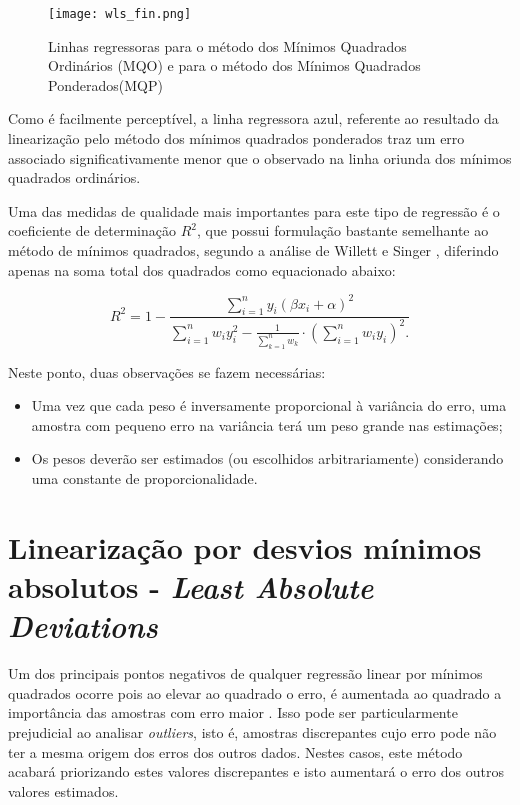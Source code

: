 \begin{figure}[htp]
    \centering
    \texttt{[image: wls\_fin.png]}
    \caption{Linhas regressoras para o método dos Mínimos Quadrados Ordinários (MQO) e para o método dos Mínimos Quadrados Ponderados(MQP)}
    \label{fig:mqomqp}
\end{figure}

Como é facilmente perceptível, a linha regressora azul, referente ao resultado da linearização pelo método dos mínimos quadrados ponderados traz um erro associado significativamente menor que o observado na linha oriunda dos mínimos quadrados ordinários.

Uma das medidas de qualidade mais importantes para este tipo de regressão é o coeficiente de determinação $R^2$, que possui formulação bastante semelhante ao método de mínimos quadrados, segundo a análise de Willett e Singer \cite{r2_weighted}, diferindo apenas na soma total dos quadrados como equacionado abaixo:

\begin{equation}\label{eq:16}
R^2 = 1 - \frac{\sum_{i=1}^{n} y_i(\beta x_i + \alpha)^2}{\sum\limits_{i=1}^{n}{w_{i}y_{i}^{2}} - \frac{1}{\sum\limits_{k=1}^{n}w_{k}} \cdot \left(\sum\limits_{i=1}^{n}{w_{i}y_{i}} \right)^{2}.}
\end{equation}

Neste ponto, duas observações se fazem necessárias:

\begin{itemize}
  \item Uma vez que cada peso é inversamente proporcional à variância do erro, uma amostra com pequeno erro na variância terá um peso grande nas estimações;
  \item Os pesos deverão ser estimados (ou escolhidos arbitrariamente) considerando uma constante de proporcionalidade.
\end{itemize}

\section{Linearização por desvios mínimos absolutos - \textit{Least Absolute Deviations}}

Um dos principais pontos negativos de qualquer regressão linear por mínimos quadrados ocorre pois ao elevar ao quadrado o erro, é aumentada ao quadrado a importância das amostras com erro maior \cite{robust}. Isso pode ser particularmente prejudicial ao analisar \textit{outliers}, isto é, amostras discrepantes cujo erro pode não ter a mesma origem dos erros dos outros dados. Nestes casos, este método acabará priorizando estes valores discrepantes e isto aumentará o erro dos outros valores estimados.

